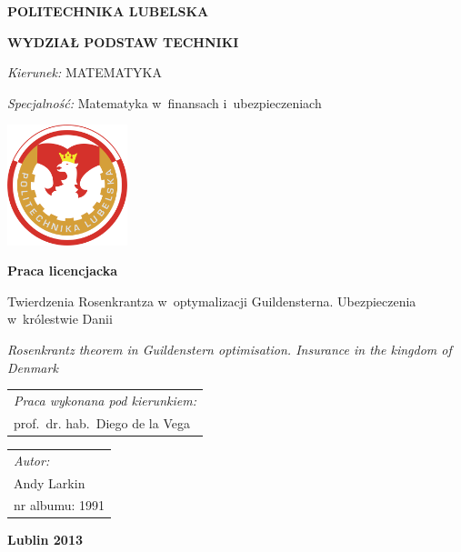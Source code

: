 \documentclass[12pt]{mwbk}
\theoremstyle{plain}
\theoremstyle{definition}
\theoremstyle{remark}
\begin{document}

\thispagestyle{empty}  %


\newcommand\tytul{Twierdzenia Rosenkrantza w~optymalizacji Guildensterna.
Ubezpieczenia w~królestwie Danii}

\newcommand\tytulangielski{Rosenkrantz theorem in Guildenstern optimisation.
Insurance in the kingdom of Denmark}


\begin{center}


{\large \bf POLITECHNIKA LUBELSKA}

{\bf WYDZIAŁ PODSTAW TECHNIKI}

\emph{Kierunek:} MATEMATYKA

\emph{Specjalność:} Matematyka w~finansach i~ubezpieczeniach

\vfill %
     

\includegraphics[width=3.5cm]{rys/logopl}

\vfill

\textbf{Praca licencjacka}

\vfill
\vfill
\vfill

\large
\tytul

\vfill

\emph{\tytulangielski}


\vfill
\vfill
\vfill
\vfill
\vfill

\begin{tabular}[t]{l}
\emph{Praca wykonana pod kierunkiem:}
\\
prof.~dr. hab.~Diego de la Vega
\end{tabular}
\hfill
\begin{tabular}[t]{l}
	\emph{Autor:}
\\
Andy Larkin\\
nr albumu: 1991 
\end{tabular}

\vfill
\vfill
\vfill

\textbf{Lublin 2013}

\end{center}
\end{document}
